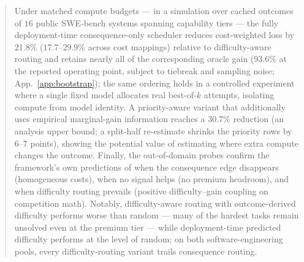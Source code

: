 \documentclass{article}
\begin{document}
\begin{abstract}
Under matched compute budgets --- in a simulation over cached outcomes of $16$ public SWE-bench systems spanning capability tiers --- the fully deployment-time consequence-only scheduler reduces cost-weighted loss by $21.8\%$ ($17.7$--$29.9\%$ across cost mappings) relative to difficulty-aware routing and retains nearly all of the corresponding oracle gain ($93.6\%$ at the reported operating point, subject to tiebreak and sampling noise; App.~\ref{app:bootstrap}); the same ordering holds in a controlled experiment where a single fixed model allocates real best-of-$k$ attempts, isolating compute from model identity. A priority-aware variant that additionally uses empirical marginal-gain information reaches a $30.7\%$ reduction (an analysis upper bound; a split-half re-estimate shrinks the priority rows by $6$--$7$ points), showing the potential value of estimating where extra compute changes the outcome. Finally, the out-of-domain probes confirm the framework's own predictions of when the consequence edge disappears (homogeneous costs), when no signal helps (no premium headroom), and when difficulty routing prevails (positive difficulty--gain coupling on competition math).
Notably, difficulty-aware routing with outcome-derived difficulty performs worse than random --- many of the hardest tasks remain unsolved even at the premium tier --- while deployment-time predicted difficulty performs at the level of random; on both software-engineering pools, every difficulty-routing variant trails consequence routing.
\end{abstract}
\end{document}

